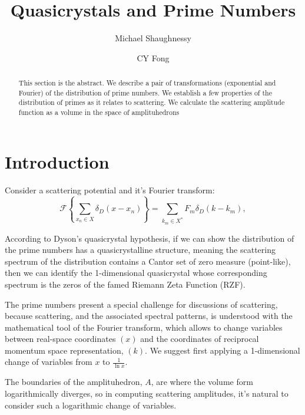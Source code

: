 \documentclass[aps,prb,twocolumn,superscriptaddress]{revtex4}
\begin{document}
\title{Quasicrystals and Prime Numbers}

\author{Michael Shaughnessy}
\author{CY Fong}

\begin{abstract}
This section is the abstract. We describe a pair of transformations (exponential and Fourier) of the distribution of prime numbers. We establish a few properties of the distribution of primes as it relates to scattering. We calculate the scattering amplitude function as a volume in the space of amplituhedrons  
\end{abstract}

\maketitle

\section{Introduction}
Consider a scattering potential and it's Fourier transform:
\begin{equation}
 \label{eq: RiemannFourier}
 \mathcal{F}\left \{ \sum_{x_n \in X}\delta_D(x - x_n) \right \} = \sum_{k_m \in X^{*}} F_{m} \delta_D(k - k_{m}),
\end{equation}


According to Dyson's quasicrystal hypothesis, if we can show the distribution of the prime numbers has a quasicrystalline structure, meaning the scattering spectrum of the distribution contains a Cantor set of zero measure (point-like), then we can identify the 1-dimensional quasicrystal whose corresponding spectrum is the zeros of the famed Riemann Zeta Function (RZF).

The prime numbers present a special challenge for discussions of scattering, because scattering, and the associated spectral patterns, is understood with the mathematical tool of the Fourier transform, which allows to change variables between real-space coordinates $(x)$ and the coordinates of reciprocal momentum space representation, $(k)$. We suggest first applying a 1-dimensional change of variables from $x$ to $\frac{1}{\ln{x}}$. 



The boundaries of the amplituhedron, $A$, are where the volume form logarithmically diverges, so in computing scattering amplitudes, it's natural to consider such a logarithmic change of variables. 
\end{document}
